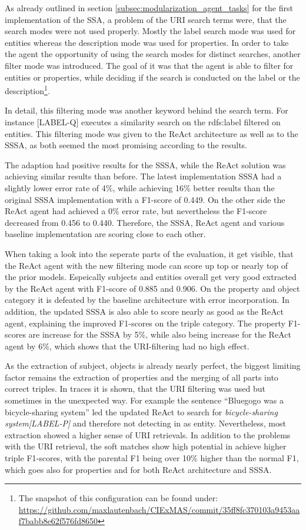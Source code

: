 \documentclass[a4paper,oneside,bibliography=totoc]{scrbook}
\begin{document}
As already outlined in section \ref{subsec:modularization_agent_tasks} for the first implementation of the \ac{SSA}, a problem of the URI search terms were, that the search modes were not used properly. Mostly the label search mode was used for entities whereas the description mode was used for properties. In order to take the agent the opportunity of using the search modes for distinct searches, another filter mode was introduced. The goal of it was that the agent is able to filter for entities or properties, while deciding if the search is conducted on the label or the description\footnote{The snapshot of this configuration can be found under: \url{https://github.com/maxlautenbach/CIExMAS/commit/35ff8fc370103a9453aaf7babb8e62f576fd8650}}.

In detail, this filtering mode was another keyword behind the search term. For instance [LABEL-Q] executes a similarity search on the rdfs:label filtered on entities. This filtering mode was given to the ReAct architecture as well as to the \ac{SSSA}, as both seemed the most promising according to the results.

The adaption had positive results for the \ac{SSSA}, while the ReAct solution was achieving similar results than before. The latest implementation \ac{SSSA} had a slightly lower error rate of 4\%, while achieving 16\% better results than the original \ac{SSSA} implementation with a F1-score of 0.449. On the other side the ReAct agent had achieved a 0\% error rate, but nevertheless the F1-score decreased from 0.456 to 0.440. Therefore, the \ac{SSSA}, ReAct agent and various baseline implementation are scoring close to each other.

When taking a look into the seperate parts of the evaluation, it get visible, that the ReAct agent with the new filtering mode can score up top or nearly top of the prior models. Espeically subjects and entities overall get very good extracted by the ReAct agent with F1-score of 0.885 and 0.906. On the property and object category it is defeated by the baseline architecture with error incorporation. In addition, the updated \ac{SSSA} is also able to score nearly as good as the ReAct agent, explaining the improved F1-scores on the triple category. The property F1-scores are increase for the \ac{SSSA} by 5\%, while also being increase for the ReAct agent by 6\%, which shows that the URI-filtering had no high effect.

As the extraction of subject, objects is already nearly perfect, the biggest limiting factor remains the extraction of properties and the merging of all parts into correct triples. In traces it is shown, that the URI filtering was used but sometimes in the unexpected way. For example the sentence \enquote{Bluegogo was a bicycle-sharing system} led the updated ReAct to search for \textit{bicycle-sharing system[LABEL-P]} and therefore not detecting in as entity. Nevertheless, most extraction showed a higher sense of URI retrievals. In addition to the problems with the URI retrieval, the soft matches show high potential in achieve higher triple F1-scores, with the parental F1 being over 10\% higher than the normal F1, which goes also for properties and for both ReAct architecture and \ac{SSSA}.
\end{document}
